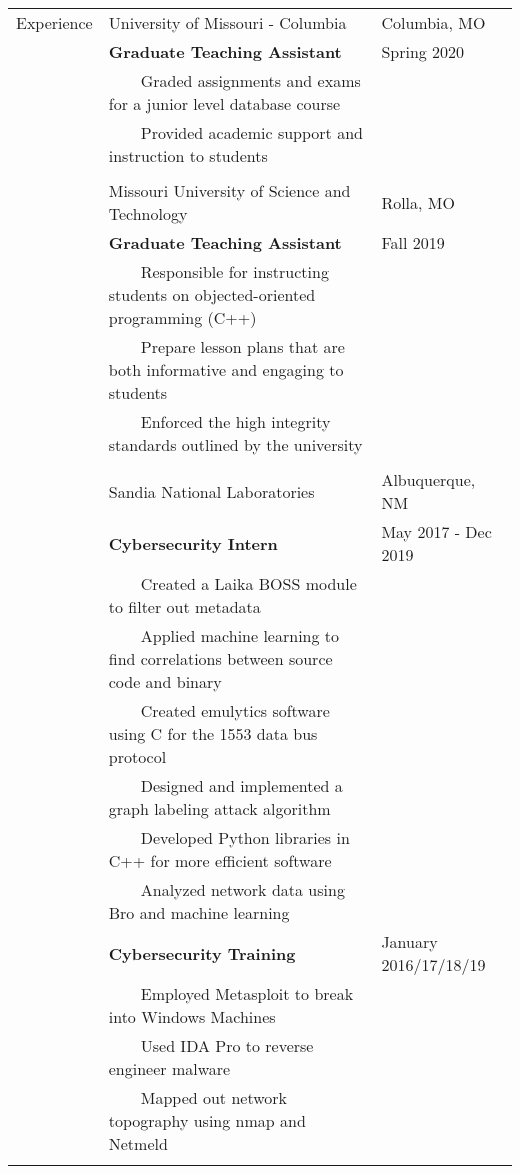 \documentclass[10.5pt, arial]{article}
\newcommand{\tabitem}{~~\llap{\textbullet}~~}
\begin{document}
\begin{tabular}{p{1.5cm} p{13.2cm} l}
Experience  
            & University of Missouri - Columbia                                 & Columbia, MO          \\
            & \textbf{Graduate Teaching Assistant}                              & Spring 2020           \\
            & \tabitem Graded assignments and exams for a junior level database course                  \\
            & \tabitem Provided academic support and instruction to students                            \\ \\

            & Missouri University of Science and Technology                     & Rolla, MO             \\
            & \textbf{Graduate Teaching Assistant}                              & Fall 2019             \\
            & \tabitem Responsible for instructing students on objected-oriented programming (C++)  &   \\
            & \tabitem Prepare lesson plans that are both informative and engaging to students      &   \\
            & \tabitem Enforced the high integrity standards outlined by the university             &   \\ \\
            
            
            & Sandia National Laboratories	& Albuquerque, NM 		\\
			& \textbf{Cybersecurity Intern}										& May 2017 - Dec 2019 		\\
			& \tabitem Created a Laika BOSS module to filter out metadata		&						\\
			& \tabitem Applied machine learning to find correlations between source code and binary & 	\\
			& \tabitem Created emulytics software using C for the 1553 data bus protocol 	&			\\
            & \tabitem Designed and implemented a graph labeling attack algorithm 	&     				\\
            & \tabitem Developed Python libraries in C++ for more efficient software 	& 				\\
            & \tabitem Analyzed network data using Bro and machine learning 			& 				\\
            & \textbf{Cybersecurity Training} 									& January 2016/17/18/19 			\\
			& \tabitem Employed Metasploit to break into Windows Machines		&	 					\\
			& \tabitem Used IDA Pro to reverse engineer malware 				& 						\\
			& \tabitem Mapped out network topography using nmap and Netmeld		&						\\ \\


\end{tabular}
\end{document}
